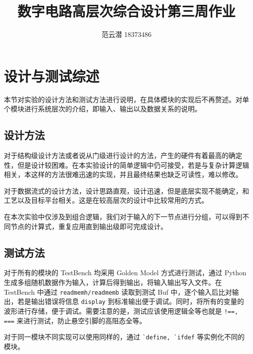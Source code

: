 \documentclass[lang=cn,11pt,a4paper,cite=authoryear]{elegantpaper}
\title{数字电路高层次综合设计\quad 第三周作业}
\author{范云潜 18373486}
\institute{微电子学院 184111 班}
\date{\zhtoday}
\begin{document}
\maketitle


\section{设计与测试综述}

本节对实验的设计方法和测试方法进行说明，在具体模块的实现后不再赘述。对单个模块进行系统层次的介绍，即输入、输出以及数据关系的说明。

\subsection{设计方法}

对于结构级设计方法或者说从门级进行设计的方法，产生的硬件有着最高的确定性，但是设计较困难。在本实验设计的简单逻辑中仍可接受，若是与复杂计算逻辑相关，本这样的方法很难迅速的实现，并且最终结果也缺乏可读性，难以修改。

对于数据流式的设计方法，设计思路直观，设计迅速，但是底层实现不能确定，和工艺以及目标平台相关。这是在较高层次的设计中比较常用的方式。

在本次实验中仅涉及到组合逻辑，我们对于输入的下一节点进行分组，可以得到不同节点的计算式，重复应用直到输出级即可完成设计。

\subsection{测试方法}

对于所有的模块的 TestBench 均采用 Golden Model 方式进行测试，通过 Python 生成多组随机数据作为输入，计算后得到输出，将输入输出写入文件。在 TestBench 中通过 \lstinline{readmemh/readmemb} 读取到测试 Buf 中，逐个输入后比对输出，若是输出错误将信息 \lstinline{display} 到标准输出便于调试。同时，将所有的变量的波形进行存储，便于调试。需要注意的是，测试应该使用逻辑全等也就是 \lstinline{!==, ===} 来进行测试，防止悬空引脚的高阻态全等。

对于同一模块不同实现可以使用同样的，通过 \lstinline{`define, `ifdef} 等实例化不同的模块。
\end{document}
